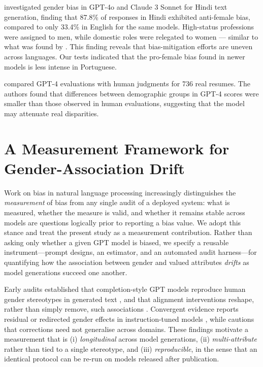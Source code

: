 \documentclass[jair,11pt,letterpaper]{article}
\begin{document}
 investigated gender bias in GPT-4o and Claude 3
Sonnet for Hindi text generation, finding that 87.8\% of
responses in Hindi exhibited anti-female bias, compared to only 33.4\%
in English for the same models. High-status professions were
assigned to men, while domestic roles were relegated to
women --- similar to what was found by . This finding
reveals that bias-mitigation efforts are uneven across languages.
Our tests indicated that the pro-female bias found in newer models
is less intense in Portuguese.

 compared GPT-4 evaluations with
human judgments for 736 real resumes. The authors found
that differences between demographic groups in GPT-4 scores were
smaller than those observed in human evaluations, suggesting that the model
may attenuate real disparities.


\section{A Measurement Framework for Gender-Association Drift}
\label{sec:framework}

Work on bias in natural language processing increasingly distinguishes the
\emph{measurement} of bias from any single audit of a deployed system: what is
measured, whether the measure is valid, and whether it remains stable across
models are questions logically prior to reporting a bias value. We adopt this
stance and treat the present study as a measurement contribution. Rather than
asking only whether a given GPT model is biased, we specify a reusable
instrument---prompt designs, an estimator, and an automated audit harness---for
quantifying how the association between gender and valued attributes
\emph{drifts} as model generations succeed one another.

Early audits established that completion-style GPT models reproduce human gender
stereotypes in generated text , and that alignment interventions
reshape, rather than simply remove, such associations .
Convergent evidence reports residual or redirected gender effects in
instruction-tuned models , while
 cautions that corrections need not generalise across domains.
These findings motivate a measurement that is (i) \emph{longitudinal} across
model generations, (ii) \emph{multi-attribute} rather than tied to a single
stereotype, and (iii) \emph{reproducible}, in the sense that an identical
protocol can be re-run on models released after publication.
\end{document}
